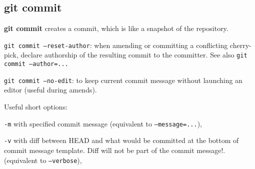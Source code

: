 %

\subsection{git commit}
\textbf{git commit} creates a commit, which is like a snapshot of the repository.

\texttt{git commit --reset-author}: when amending or committing a conflicting cherry-pick, declare authorship of the resulting commit to the committer.
See also \texttt{git commit --author=...}

\texttt{git commit --no-edit}: to keep current commit message without launching an editor (useful during amends).

Useful short options:
\begin{compactenum}
\item [\texttt{-m}] with specified commit message (equivalent to \texttt{--message=...}),
\item [\texttt{-v}] with diff between HEAD and what would be committed at the bottom of commit message template.
Diff will not be part of the commit message!.
(equivalent to \texttt{--verbose}),
\end{compactenum}

%